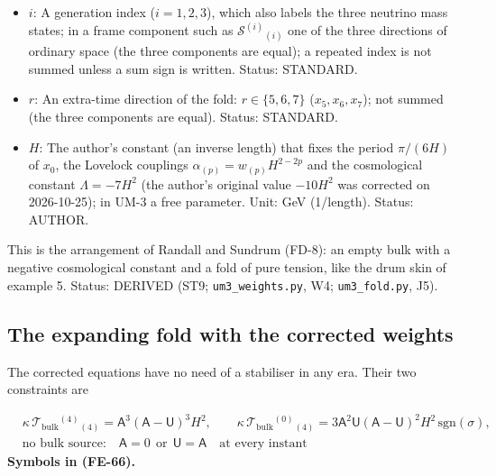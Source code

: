 \documentclass[
  10pt,
]{article}
\begin{document}
\begin{itemize}
  energy density, \(\mathcal{S}^1{}_1\) and \(\mathcal{S}^5{}_5\) its
  pressures along ordinary space and along the extra times (frame
  components along the fold, eight-dimensional normalisation: an energy
  per unit volume of the six other directions of the fold). Unit:
  GeV\(^7\). Value:
  \(\kappa\mathcal{S}^a{}_b = -\frac{32}{5}H\delta^a{}_b\) at the static
  block. Status: DERIVED.
\item
  \(i\): A generation index (\(i = 1, 2, 3\)), which also labels the
  three neutrino mass states; in a frame component such as
  \(\mathcal{S}^{(i)}{}_{(i)}\) one of the three directions of ordinary
  space (the three components are equal); a repeated index is not summed
  unless a sum sign is written. Status: STANDARD.
\item
  \(r\): An extra-time direction of the fold: \(r \in \{5, 6, 7\}\)
  (\(x_5, x_6, x_7\)); not summed (the three components are equal).
  Status: STANDARD.
\item
  \(H\): The author's constant (an inverse length) that fixes the period
  \(\pi/(6H)\) of \(x_0\), the Lovelock couplings
  \(\alpha_{(p)} = w_{(p)}H^{2-2p}\) and the cosmological constant
  \(\Lambda = -7H^2\) (the author's original value \(-10H^2\) was
  corrected on 2026-10-25); in UM-3 a free parameter. Unit: GeV
  (1/length). Status: AUTHOR.
\end{itemize}

This is the arrangement of Randall and Sundrum (FD-8): an empty bulk
with a negative cosmological constant and a fold of pure tension, like
the drum skin of example 5. Status: DERIVED (ST9;
\texttt{um3\_weights.py}, W4; \texttt{um3\_fold.py}, J5).

\hypertarget{the-expanding-fold-with-the-corrected-weights}{%
\subsection{The expanding fold with the corrected
weights}\label{the-expanding-fold-with-the-corrected-weights}}

The corrected equations have no need of a stabiliser in any era. Their
two constraints are

\[
\begin{aligned}
&\kappa\,\mathcal{T}_{\mathrm{bulk}}{}^{(4)}{}_{(4)} = \mathsf{A}^3(\mathsf{A} - \mathsf{U})^3H^2,\qquad
 \kappa\,\mathcal{T}_{\mathrm{bulk}}{}^{(0)}{}_{(4)} = 3\mathsf{A}^2\mathsf{U}(\mathsf{A} - \mathsf{U})^2H^2\,\mathrm{sgn}(\sigma),\\
&\text{no bulk source:}\quad \mathsf{A} = 0\ \ \text{or}\ \ \mathsf{U} = \mathsf{A}\quad\text{at every instant}
\end{aligned} \tag{FE-66}
\] \textbf{Symbols in (FE-66).}
\end{document}
